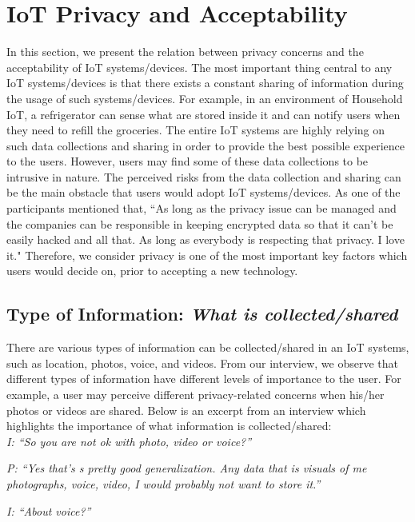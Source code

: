 \section{IoT Privacy and Acceptability}
In this section, we present the relation between privacy concerns and the acceptability of IoT systems/devices. The most important thing central to any IoT systems/devices is that there exists a constant sharing of information during the usage of such systems/devices. For example, in an environment of Household IoT, a refrigerator can sense what are stored inside it and can notify users when they need to refill the groceries. The entire IoT systems are highly relying on such data collections and sharing in order to provide the best possible experience to the users. However, users may find some of these data collections to be intrusive in nature. The perceived risks from the data collection and sharing can be the main obstacle that users would adopt IoT systems/devices. As one of the participants mentioned that, ``As long as the privacy issue can be managed and the companies can be responsible in keeping encrypted data so that it can't be easily hacked and all that. As long as everybody is respecting that privacy. I love it." Therefore, we consider privacy is one of the most important key factors which users would decide on, prior to accepting a new technology.

\subsection{Type of Information: \textit{What is collected/shared}}
There are various types of information can be collected/shared in an IoT systems, such as location, photos, voice, and videos. From our interview, we observe that different types of information have different levels of importance to the user. For example, a user may perceive different privacy-related concerns when his/her photos or videos are shared. Below is an excerpt from an interview which highlights the importance of what information is collected/shared:\\

\textit{I: ``So you are not ok with photo, video or voice?''\\}

\textit{P: ``Yes that's s pretty good generalization. Any data that is visuals of me photographs, voice, video, I would probably not want to store it.''\\}

\textit{I: ``About voice?''\\}

